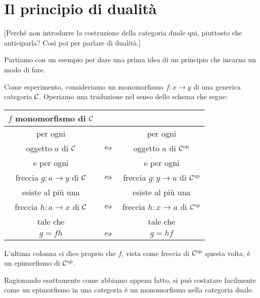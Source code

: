 
\section{Il principio di dualità}

{\color{red} [Perché non introdurre la costruzione della categoria duale qui, piuttosto che anticiparla? Così poi per parlare di dualità.]}

Partiamo con un esempio per dare una prima idea di un principio che incarna un modo di fare.

\begin{esempio}
Come esperimento, consideriamo un monomorfismo \(f : x \to y\) di una generica categoria \(\mathcal C\). Operiamo una traduzione nel senso dello schema che segue:
%
\begin{center}
\begin{tabular}{ccc}
\toprule
\(f\) monomorfismo di \(\mathcal C\) & & \\
\midrule
per ogni & & per ogni \\
oggetto \(a\) di \(\mathcal C\) & \(\leftrightsquigarrow\) & oggetto \(a\) di \(\mathcal C^\text{op}\) \\
e per ogni & & e per ogni \\
freccia \(g : a \to y\) di \(\mathcal C\) & \(\leftrightsquigarrow\) & freccia \(g : y \to a\) di \(\mathcal C^\text{op}\) \\
esiste al più una &  & esiste al più una \\
freccia \(h : a \to x\) di \(\mathcal C\) & \(\leftrightsquigarrow\) & freccia \(h : x \to a\) di \(\mathcal C^\text{op}\) \\
tale che & & tale che \\
\(g = fh\) & \(\leftrightsquigarrow\) & \(g = hf\) \\
\end{tabular}
\end{center}
%
L'ultima colonna ci dice proprio che \(f\), vista come freccia di \(\mathcal C^\text{op}\) questa volta, è un epimorfismo di \(\mathcal C^\text{op}\).
\end{esempio}

\begin{esercizio}
Ragionando esattamente come abbiamo appena fatto, si può costatare facilmente come un epimorfismo in una categoria è un monomorfismo nella categoria duale.
\end{esercizio}

